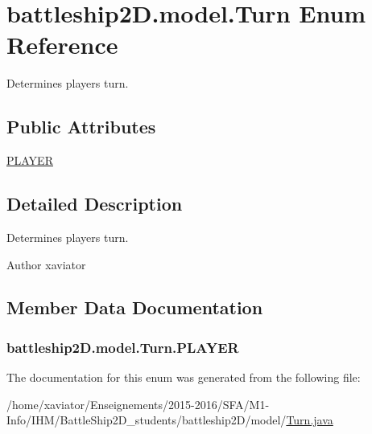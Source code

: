 \hypertarget{enumbattleship2D_1_1model_1_1Turn}{\section{battleship2\-D.\-model.\-Turn Enum Reference}
\label{enumbattleship2D_1_1model_1_1Turn}
}


Determines players turn.  


\subsection*{Public Attributes}
\begin{DoxyCompactItemize}
\item 
\hyperlink{enumbattleship2D_1_1model_1_1Turn_aacc7f588f1f6638fa52de86be30e5ce2}{P\-L\-A\-Y\-E\-R}
\end{DoxyCompactItemize}


\subsection{Detailed Description}
Determines players turn. 

\begin{DoxyAuthor}{Author}
xaviator 
\end{DoxyAuthor}


\subsection{Member Data Documentation}
\hypertarget{enumbattleship2D_1_1model_1_1Turn_aacc7f588f1f6638fa52de86be30e5ce2}{
\subsubsection[{P\-L\-A\-Y\-E\-R}]{\setlength{\rightskip}{0pt plus 5cm}battleship2\-D.\-model.\-Turn.\-P\-L\-A\-Y\-E\-R}}\label{enumbattleship2D_1_1model_1_1Turn_aacc7f588f1f6638fa52de86be30e5ce2}


The documentation for this enum was generated from the following file\-:\begin{DoxyCompactItemize}
\item 
/home/xaviator/\-Enseignements/2015-\/2016/\-S\-F\-A/\-M1-\/\-Info/\-I\-H\-M/\-Battle\-Ship2\-D\-\_\-students/battleship2\-D/model/\hyperlink{Turn_8java}{Turn.\-java}\end{DoxyCompactItemize}
